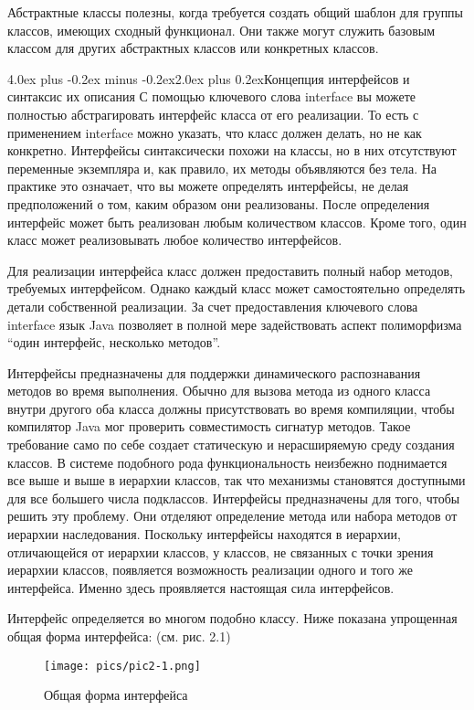 \documentclass[12pt, a4paper]{book}%
\makeatletter
\renewcommand{\section}{\@startsection{section}{1}{1pt}%
{4.0ex plus -0.2ex minus -0.2ex}{2.0ex plus 0.2ex}{\centering\bf}}%
\makeatother
\begin{document}
{Абстрактные классы полезны, когда требуется создать общий шаблон для группы классов, имеющих сходный функционал. Они также могут служить базовым классом для других абстрактных классов или конкретных классов.

\section{Концепция интерфейсов и синтаксис их описания}
С помощью ключевого слова interface вы можете полностью абстрагировать интерфейс класса от его реализации. То есть с применением interface можно указать, что класс должен делать, но не как конкретно. Интерфейсы синтаксически похожи на классы, но в них отсутствуют переменные экземпляра и, как правило, их методы объявляются без тела. На практике это означает, что вы можете определять интерфейсы, не делая предположений о том, каким образом они реализованы. После определения интерфейс может быть реализован любым количеством классов. Кроме того, один класс может реализовывать любое количество интерфейсов.

Для реализации интерфейса класс должен предоставить полный набор методов, требуемых интерфейсом. Однако каждый класс может самостоятельно определять детали собственной реализации. За счет предоставления ключевого слова interface язык Java позволяет в полной мере задействовать аспект полиморфизма “один интерфейс, несколько методов”.

Интерфейсы предназначены для поддержки динамического распознавания методов во время выполнения. Обычно для вызова метода из одного класса внутри другого оба класса должны присутствовать во время компиляции, чтобы компилятор Java мог проверить совместимость сигнатур методов. Такое требование само по себе создает статическую и нерасширяемую среду создания классов. В системе подобного рода функциональность неизбежно поднимается все выше и выше в иерархии классов, так что механизмы становятся доступными для все большего числа подклассов. Интерфейсы предназначены для того, чтобы решить эту проблему. Они отделяют определение метода или набора методов от иерархии наследования. Поскольку интерфейсы находятся в иерархии, отличающейся от иерархии классов, у классов, не связанных с точки зрения иерархии классов, появляется возможность реализации одного и того же интерфейса. Именно здесь проявляется настоящая сила интерфейсов.

Интерфейс определяется во многом подобно классу. Ниже показана упрощенная общая форма интерфейса: (см. рис. 2.1)
\begin{figure}[h!]\center
  \texttt{[image: pics/pic2-1.png]}
   \caption{Общая форма интерфейса}\label{ris1}
\end{figure}

}
\end{document}
